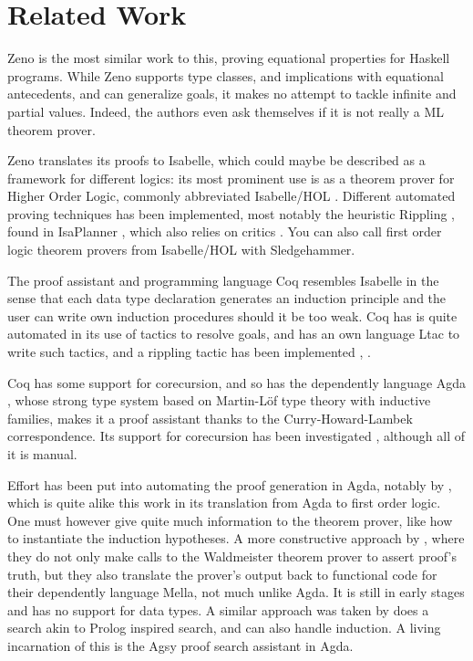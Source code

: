 \section{Related Work}

Zeno \citep{zeno} is the most similar work to this, proving equational
properties for Haskell programs. While Zeno supports type classes, and
implications with equational antecedents, and can generalize goals, it
makes no attempt to tackle infinite and partial values. Indeed, the
authors even ask themselves if it is not really a ML theorem prover.

Zeno translates its
proofs to Isabelle, which could maybe be described as a framework for
different logics: its most prominent use is as a theorem prover for
Higher Order Logic, commonly abbreviated Isabelle/HOL
\citep{isabelbook}. Different automated proving techniques has been
implemented, most notably the heuristic Rippling \citep{dixonphd},
found in IsaPlanner \citep{isaplanner}, which also relies on critics
\citep{productiveuse}. You can also call first order logic theorem
provers from Isabelle/HOL with Sledgehammer.

The proof assistant and programming language Coq resembles Isabelle in
the sense that each data type declaration generates an induction
principle and the user can write own induction procedures should it be
too weak. Coq has is quite automated in its use of tactics to resolve
goals, and has an own language Ltac to write such tactics, and a
rippling tactic has been implemented \citep{automateddtfp},
\citep{inductioncoq}.

Coq has some support for corecursion, and so has the dependently
language Agda \citep{norell:thesis}, whose strong type system based on
Martin-Löf type theory \citep{mltt} with inductive families, makes it a proof
assistant thanks to the Curry-Howard-Lambek correspondence. Its
support for corecursion has been investigated \citep{productivity},
although all of it is manual.

Effort has been put into automating the proof generation in Agda,
notably by \cite{agdaatp}, which is quite alike this work in its
translation from Agda to first order logic. One must however give
quite much information to the theorem prover, like how to instantiate
the induction hypotheses. %
A more constructive approach by \cite{dtatp}, where they
do not only make calls to the Waldmeister theorem prover to assert
proof's truth, but they also translate the prover's output back to
functional code for their dependently language Mella, not much unlike
Agda. It is still in early stages and has no support for data
types. A similar approach was taken by \cite{agsy}
does a search akin to Prolog inspired search, and can also handle
induction. A living incarnation of this is the Agsy proof search
assistant in Agda.

